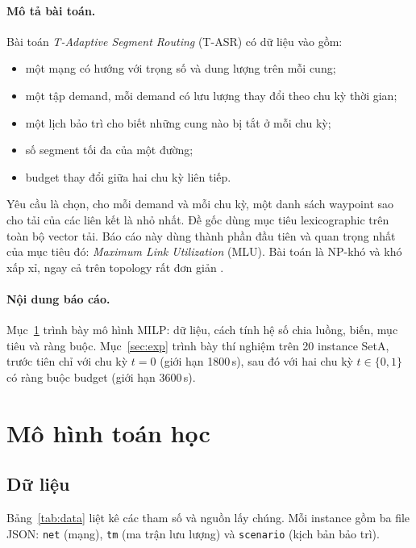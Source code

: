 \documentclass[11pt,a4paper]{article}
\begin{document}
\paragraph{Mô tả bài toán.}
Bài toán \emph{T-Adaptive Segment Routing} (T-ASR) \cite{subject,benhamiche2026} có dữ liệu vào gồm:
\begin{itemize}
\item một mạng có hướng với trọng số và dung lượng trên mỗi cung;
\item một tập demand, mỗi demand có lưu lượng thay đổi theo chu kỳ thời gian;
\item một lịch bảo trì cho biết những cung nào bị tắt ở mỗi chu kỳ;
\item số segment tối đa của một đường;
\item budget thay đổi giữa hai chu kỳ liên tiếp.
\end{itemize}
Yêu cầu là chọn, cho mỗi demand và mỗi chu kỳ, một danh sách waypoint sao cho tải của các liên kết là nhỏ nhất.
Đề gốc dùng mục tiêu lexicographic trên toàn bộ vector tải.
Báo cáo này dùng thành phần đầu tiên và quan trọng nhất của mục tiêu đó: \emph{Maximum Link Utilization} (MLU).
Bài toán là NP-khó và khó xấp xỉ, ngay cả trên topology rất đơn giản \cite{bazgan2025}.

\paragraph{Nội dung báo cáo.}
Mục~\ref{sec:model} trình bày mô hình MILP: dữ liệu, cách tính hệ số chia luồng, biến, mục tiêu và ràng buộc.
Mục~\ref{sec:exp} trình bày thí nghiệm trên 20 instance SetA, trước tiên chỉ với chu kỳ $t=0$ (giới hạn 1800\,s), sau đó với hai chu kỳ $t\in\{0,1\}$ có ràng buộc budget (giới hạn 3600\,s).

\section{Mô hình toán học}\label{sec:model}

\subsection{Dữ liệu}

Bảng~\ref{tab:data} liệt kê các tham số và nguồn lấy chúng.
Mỗi instance gồm ba file JSON: \texttt{net} (mạng), \texttt{tm} (ma trận lưu lượng) và \texttt{scenario} (kịch bản bảo trì).
\end{document}
